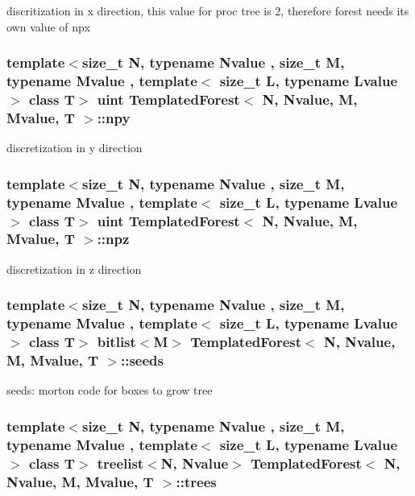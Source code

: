 discritization in x direction, this value for proc tree is 2, therefore forest needs its own value of npx \hypertarget{classTemplatedForest_a4172d85562b587e738c55dcebea68d5a}{
\subsubsection[{npy}]{\setlength{\rightskip}{0pt plus 5cm}template$<$size\_\-t N, typename Nvalue , size\_\-t M, typename Mvalue , template$<$ size\_\-t L, typename Lvalue $>$ class T$>$ uint {\bf TemplatedForest}$<$ N, Nvalue, M, Mvalue, T $>$::{\bf npy}}}
\label{classTemplatedForest_a4172d85562b587e738c55dcebea68d5a}
discretization in y direction \hypertarget{classTemplatedForest_ad52e1ef3aa696efd96f73acce54d6bba}{
\subsubsection[{npz}]{\setlength{\rightskip}{0pt plus 5cm}template$<$size\_\-t N, typename Nvalue , size\_\-t M, typename Mvalue , template$<$ size\_\-t L, typename Lvalue $>$ class T$>$ uint {\bf TemplatedForest}$<$ N, Nvalue, M, Mvalue, T $>$::{\bf npz}}}
\label{classTemplatedForest_ad52e1ef3aa696efd96f73acce54d6bba}
discretization in z direction \hypertarget{classTemplatedForest_a49435a137ed1829498d249829139b4a9}{
\subsubsection[{seeds}]{\setlength{\rightskip}{0pt plus 5cm}template$<$size\_\-t N, typename Nvalue , size\_\-t M, typename Mvalue , template$<$ size\_\-t L, typename Lvalue $>$ class T$>$ bitlist$<$M$>$ {\bf TemplatedForest}$<$ N, Nvalue, M, Mvalue, T $>$::{\bf seeds}}}
\label{classTemplatedForest_a49435a137ed1829498d249829139b4a9}
seeds: morton code for boxes to grow tree \hypertarget{classTemplatedForest_af8453636607eeaa4f9594d698cf163a9}{
\subsubsection[{trees}]{\setlength{\rightskip}{0pt plus 5cm}template$<$size\_\-t N, typename Nvalue , size\_\-t M, typename Mvalue , template$<$ size\_\-t L, typename Lvalue $>$ class T$>$ treelist$<$N, Nvalue$>$ {\bf TemplatedForest}$<$ N, Nvalue, M, Mvalue, T $>$::{\bf trees}}}
